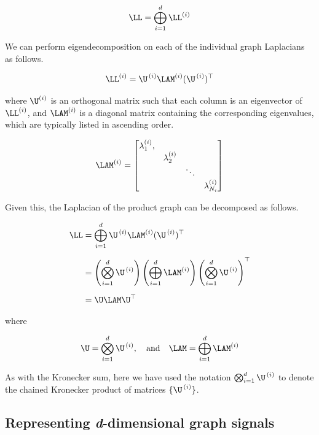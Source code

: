 \begin{equation}
    \LL = \bigoplus_{i=1}^d  \LL^{(i)}
\end{equation}

We can perform eigendecomposition on each of the individual graph Laplacians as follows. 

\begin{equation}
    \LL^{(i)} = \U^{\,(i)} \LAM^{(i)} (\U^{\,(i)})^\top
\end{equation}

\noindent where $ \U^{(i)}$ is an orthogonal matrix such that each column is an eigenvector of $\LL^{(i)}$, and $\LAM^{(i)}$ is a diagonal matrix containing the corresponding eigenvalues, which are typically listed in ascending order. 

$$
\LAM^{(i)} = 
\begin{bmatrix}
    \lambda_1^{(i)}, &                 &        &                 \\
                     & \lambda_2^{(i)} &        &                 \\
                     &                 & \ddots &                 \\
                     &                 &        & \lambda_{N_i}^{(i)} \\
\end{bmatrix}
$$

Given this, the Laplacian of the product graph can be decomposed as follows. 

\begin{align}
    \LL &= \bigoplus_{i=1}^d \U^{\,(i)} \LAM^{(i)} (\U^{\,(i)})^\top \notag \\[0.2cm]
    &= \left( \bigotimes_{i=1}^d  \U^{\,(i)} \right) \left(\bigoplus_{i=1}^d \LAM^{(i)} \right) \left(\bigotimes_{i=1}^d  \U^{\,(i)} \right)^\top \notag \\[0.2cm]
    &= \U \LAM \U^\top 
\end{align}

\noindent where 

\begin{equation}
    \label{eq:U_LAM_def}
    \U =  \bigotimes_{i=1}^d  \U^{\,(i)} , \quad \text{and} \quad \LAM =  \bigoplus_{i=1}^d \LAM^{(i)}
\end{equation}


As with the Kronecker sum, here we have used the notation $\bigotimes_{i=1}^d  \U^{\,(i)}$ to denote the chained Kronecker product of matrices $\{\U^{\,(i)}  \}$. 

\subsection{Representing \textit{d}-dimensional graph signals}

